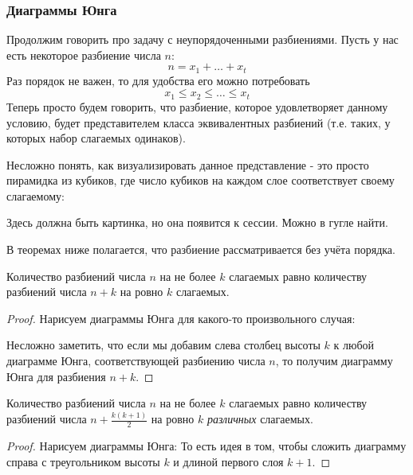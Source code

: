 \subsubsection*{Диаграммы Юнга}

Продолжим говорить про задачу с неупорядоченными разбиениями. Пусть у нас есть некоторое разбиение числа $n$:
\[
	n = x_1 + \ldots + x_t
\]
Раз порядок не важен, то для удобства его можно потребовать
\[
	x_1 \le x_2 \le \ldots \le x_t
\]
Теперь просто будем говорить, что разбиение, которое удовлетворяет данному условию, будет представителем класса эквивалентных разбиений (т.е. таких, у которых набор слагаемых одинаков).

Несложно понять, как визуализировать данное представление - это просто пирамидка из кубиков, где число кубиков на каждом слое соответствует своему слагаемому:

Здесь должна быть картинка, но она появится к сессии. Можно в гугле найти.

\begin{note}
	В теоремах ниже полагается, что разбиение рассматривается без учёта порядка.
\end{note}

\begin{theorem}
	Количество разбиений числа $n$ на не более $k$ слагаемых равно количеству разбиений числа $n + k$ на ровно $k$ слагаемых.
\end{theorem}

\begin{proof}
	Нарисуем диаграммы Юнга для какого-то произвольного случая:
	
	Несложно заметить, что если мы добавим слева столбец высоты $k$ к любой диаграмме Юнга, соответствующей разбиению числа $n$, то получим диаграмму Юнга для разбиения $n + k$.
\end{proof}

\begin{theorem}
	Количество разбиений числа $n$ на не более $k$ слагаемых равно количеству разбиений числа $n + \frac{k(k + 1)}{2}$ на ровно $k$ \textit{различных} слагаемых.
\end{theorem}

\begin{proof}
	Нарисуем диаграммы Юнга:
	То есть идея в том, чтобы сложить диаграмму справа с треугольником высоты $k$ и длиной первого слоя $k + 1$.
\end{proof}

